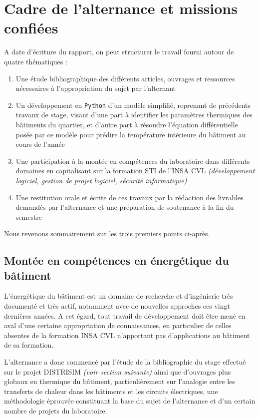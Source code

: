 \chapter{Cadre de l'alternance et missions confiées}\label{ch:cadre-de-l'alternance-et-missions-confiees}

A date d'écriture du rapport, on peut structurer le travail fourni autour de quatre thématiques :
\begin{enumerate}
    \item Une étude bibliographique des différents articles, ouvrages et ressources nécessaires à l'appropriation du sujet par l'alternant
    \item Un développement en \texttt{Python} d'un modèle simplifié, reprenant de précédents travaux de stage, visant d'une part à identifier les paramètres thermiques des bâtiments du quartier, et d'autre part à résoudre l'équation différentielle posée par ce modèle pour prédire la température intérieure du bâtiment au cours de l'année
    \item Une participation à la montée en compétences du laboratoire dans différents domaines en capitalisant sur la formation \gls{STI} de l'INSA CVL \textit{(développement logiciel, gestion de projet logiciel, sécurité informatique)}
    \item Une restitution orale et écrite de ces travaux par la rédaction des livrables demandés par l'alternance et une préparation de soutenance à la fin du semestre
\end{enumerate}

Nous revenons sommairement sur les trois premiers points ci-après.

\section{Montée en compétences en énergétique du bâtiment}\label{sec:montee-en-competences-en-energetique-du-batiment}
    
    L'énergétique du bâtiment est un domaine de recherche et d'ingénierie très documenté et très actif, notamment avec de nouvelles approches ces vingt dernières années.
    A cet égard, tout travail de développement doit être mené en aval d'une certaine appropriation de connaissances, en particulier de celles absentes de la formation INSA CVL n'apportant pas d'applications au bâtiment de sa formation.

    L'alternance a donc commencé par l'étude de la bibliographie du stage effectué sur le projet DISTRISIM \textit{(voir section suivante)} ainsi que d'ouvrages plus globaux en thermique du bâtiment, particulièrement sur l'analogie entre les transferts de chaleur dans les bâtiments et les circuits électriques, une méthodologie éprouvée constituant la base du sujet de l'alternance et d'un certain nombre de projets du laboratoire.

